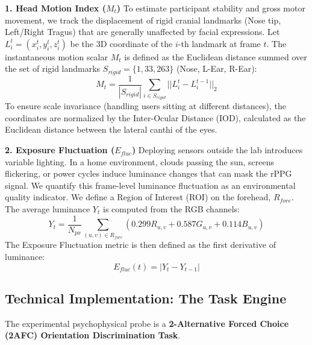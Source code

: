 \documentclass[final,3p,times,twocolumn]{elsarticle}
\begin{document}
\textbf{1. Head Motion Index ($M_t$)}
To estimate participant stability and gross motor movement, we track the displacement of rigid cranial landmarks (Nose tip, Left/Right Tragus) that are generally unaffected by facial expressions.
Let $L_i^t = (x_i^t, y_i^t, z_i^t)$ be the 3D coordinate of the $i$-th landmark at frame $t$.
The instantaneous motion scalar $M_t$ is defined as the Euclidean distance summed over the set of rigid landmarks $S_{rigid} = \{1, 33, 263\}$ (Nose, L-Ear, R-Ear):
\begin{equation}
    M_t = \frac{1}{|S_{rigid}|} \sum_{i \in S_{rigid}} || L_i^t - L_i^{t-1} ||_2
\end{equation}
To ensure scale invariance (handling users sitting at different distances), the coordinates are normalized by the Inter-Ocular Distance (IOD),
calculated as the Euclidean distance between the lateral canthi of the eyes.

\textbf{2. Exposure Fluctuation ($E_{fluc}$)}
Deploying sensors outside the lab introduces variable lighting. In a home environment, clouds passing the sun, screens flickering, or power cycles induce luminance changes that can mask the rPPG signal.
We quantify this frame-level luminance fluctuation as an environmental quality indicator.
We define a Region of Interest (ROI) on the forehead, $R_{fore}$. The average luminance $Y_t$ is computed from the RGB channels:
\begin{equation}
    Y_t = \frac{1}{N_{px}} \sum_{(u,v) \in R_{fore}} (0.299R_{u,v} + 0.587G_{u,v} + 0.114B_{u,v})
\end{equation}
The Exposure Fluctuation metric is then defined as the first derivative of luminance:
\begin{equation}
    E_{fluc}(t) = | Y_t - Y_{t-1} |
\end{equation}

\subsection{Technical Implementation: The Task Engine}
The experimental psychophysical probe is a \textbf{2-Alternative Forced Choice (2AFC) Orientation Discrimination Task}.
\end{document}
